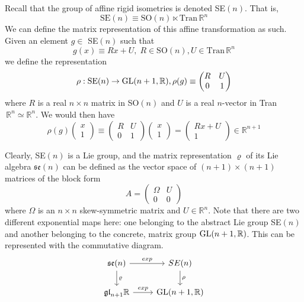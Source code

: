   Recall that the group of affine rigid isometries is denoted SE$(n)$. That is, 
  \begin{equation}
    \text{SE}(n) \equiv \text{SO}(n) \ltimes \text{Tran}\,\mathbb{R}^n
  \end{equation}
  We can define the matrix representation of this affine transformation as such. Given an element $g \in$ SE$(n)$ such that
  \begin{equation}
    g(x) \equiv R x + U, \; R \in \text{SO}(n), U \in \text{Tran}\, \mathbb{R}^n 
  \end{equation}
  we define the representation
  \begin{equation}
    \rho: \text{SE}(n) \rightarrow \operatorname{GL}(n+1, \mathbb{R}), \rho(g) \equiv \begin{pmatrix}
    R&U\\0&1
    \end{pmatrix}
  \end{equation}
  where $R$ is a real $n\times n$ matrix in SO$(n)$ and $U$ is a real $n$-vector in Tran$\,\mathbb{R}^n \simeq \mathbb{R}^n$. We would then have
  \begin{equation}
    \rho(g) \begin{pmatrix}
    x\\1
    \end{pmatrix} \equiv \begin{pmatrix}
    R&U\\0&1
    \end{pmatrix} \begin{pmatrix}
    x\\1
    \end{pmatrix} = \begin{pmatrix}
    R x + U\\1
    \end{pmatrix} \in \mathbb{R}^{n+1}
  \end{equation}

  Clearly, SE$(n)$ is a Lie group, and the matrix representation $\varrho$ of its Lie algebra $\mathfrak{se}(n)$ can be defined as the vector space of $(n+1) \times (n+1)$ matrices of the block form 
  \begin{equation}
    A = \begin{pmatrix}
    \Omega & U \\0 & 0
    \end{pmatrix}
  \end{equation}
  where $\Omega$ is an $n \times n$ skew-symmetric matrix and $U \in \mathbb{R}^n$. Note that there are two different exponential maps here: one belonging to the abstract Lie group SE$(n)$ and another belonging to the concrete, matrix group $\operatorname{GL}(n+1, \mathbb{R})$. This can be represented with the commutative diagram. 
  \[\begin{tikzcd}
  \mathfrak{se}(n) \arrow{r}{exp} \arrow{d}{\varrho} & SE(n) \arrow{d} {\rho}\\
  \mathfrak{gl}_{n+1} \mathbb{R} \arrow{r}{exp} & \GL(n+1, \mathbb{R})
  \end{tikzcd}\]

